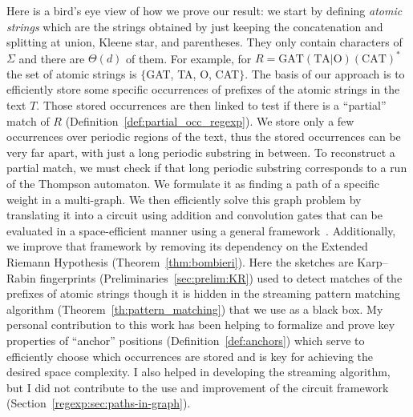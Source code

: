 Here is a bird's eye view of how we prove our result: we start by defining \emph{atomic strings} which are the strings obtained by just keeping the concatenation and splitting at union, Kleene star, and parentheses. They only contain characters of $\Sigma$ and there are $\Theta(d)$ of them. For example, for $R= \mathrm{GAT}(\mathrm{TA} | \mathrm{O})(\mathrm{CAT})^*$  the set of atomic strings is $\{$GAT, TA, O, CAT$\}$.
%
The basis of our approach is to efficiently store some specific occurrences of prefixes of the atomic strings in the text $T$. Those stored occurrences are then linked to test if there is a “partial” match of $R$ (Definition~\ref*{def:partial_occ_regexp}). We store only a few occurrences over periodic regions of the text, thus the stored occurrences can be very far apart, with just a long periodic substring in between. To reconstruct a partial match, we must check if that long periodic substring corresponds to a run of the Thompson automaton. We formulate it as finding a path of a specific weight in a multi-graph. We then efficiently solve this graph problem by translating it into a circuit using addition and convolution gates that can be evaluated in a space-efficient manner using a general framework~\cite{LokshtanovN10,Bringmann17}. Additionally, we improve that framework by removing its dependency on the Extended Riemann Hypothesis (Theorem~\ref{thm:bombieri}). 
Here the sketches are Karp--Rabin fingerprints (Preliminaries~\ref{sec:prelim:KR}) used to detect matches of the prefixes of atomic strings though it is hidden in the streaming pattern matching algorithm (Theorem~\ref{th:pattern_matching}) that we use as a black box.
My personal contribution to this work has been helping to formalize and prove key properties of ``anchor'' positions (Definition~\ref{def:anchors}) which serve to efficiently choose which occurrences are stored and is key for achieving the desired space complexity. I also helped in developing the streaming algorithm, but I did not contribute to the use and improvement of the circuit framework (Section~\ref{regexp:sec:paths-in-graph}).



